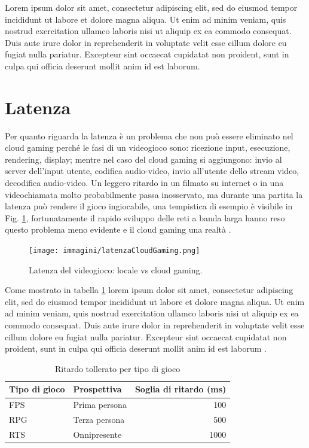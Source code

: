 Lorem ipsum dolor sit amet, consectetur adipiscing elit, sed do eiusmod tempor incididunt ut labore et dolore magna aliqua. Ut enim ad minim veniam, quis nostrud exercitation ullamco laboris nisi ut aliquip ex ea commodo consequat. Duis aute irure dolor in reprehenderit in voluptate velit esse cillum dolore eu fugiat nulla pariatur. Excepteur sint occaecat cupidatat non proident, sunt in culpa qui officia deserunt mollit anim id est laborum.
\parencite{StreamingMobileCloudGamingVideoOverTCPWithAdaptiveSourceFECCoding}


\section{Latenza} \label{sec:cap4_Latenza}
Per quanto riguarda la latenza è un problema che non può essere eliminato nel cloud gaming perché le fasi di un videogioco sono: ricezione input, esecuzione, rendering, display; mentre nel caso del cloud gaming si aggiungono: invio al server dell'input utente, codifica audio-video, invio all'utente dello stream video, decodifica audio-video. Un leggero ritardo in un filmato su internet o in una videochiamata molto probabilmente passa inosservato, ma durante una partita la latenza può rendere il gioco ingiocabile, una tempistica di esempio è visibile in Fig. \ref{fig:latenzaCloudGaming}, fortunatamente il rapido sviluppo delle reti a banda larga hanno reso questo problema meno evidente e il cloud gaming una realtà \parencite{Cloud_Gaming_Architecture_and_Performance}.

\begin{figure}[H]
	\texttt{[image: immagini/latenzaCloudGaming.png]}
	\caption{Latenza del videogioco: locale vs cloud gaming.}
	\label{fig:latenzaCloudGaming}
\end{figure}


Come mostrato in tabella \ref{table:Ritardo_tollerato_per_tipo_di_gioco} lorem ipsum dolor sit amet, consectetur adipiscing elit, sed do eiusmod tempor incididunt ut labore et dolore magna aliqua. Ut enim ad minim veniam, quis nostrud exercitation ullamco laboris nisi ut aliquip ex ea commodo consequat. Duis aute irure dolor in reprehenderit in voluptate velit esse cillum dolore eu fugiat nulla pariatur. Excepteur sint occaecat cupidatat non proident, sunt in culpa qui officia deserunt mollit anim id est laborum \parencite{Cloud_Gaming_Architecture_and_Performance}.

\begin{table}[H]
	\centering
	\begin{tabular}{||l l r||}
		\hline
		Tipo di gioco & Prospettiva & Soglia di ritardo (ms) \\
		\hline\hline
		FPS & Prima persona & 100 \\
		\hline
		RPG & Terza persona & 500 \\
		\hline
		RTS & Onnipresente & 1000 \\
		\hline
	\end{tabular}

	\caption{Ritardo tollerato per tipo di gioco}
	\label{table:Ritardo_tollerato_per_tipo_di_gioco}
\end{table}